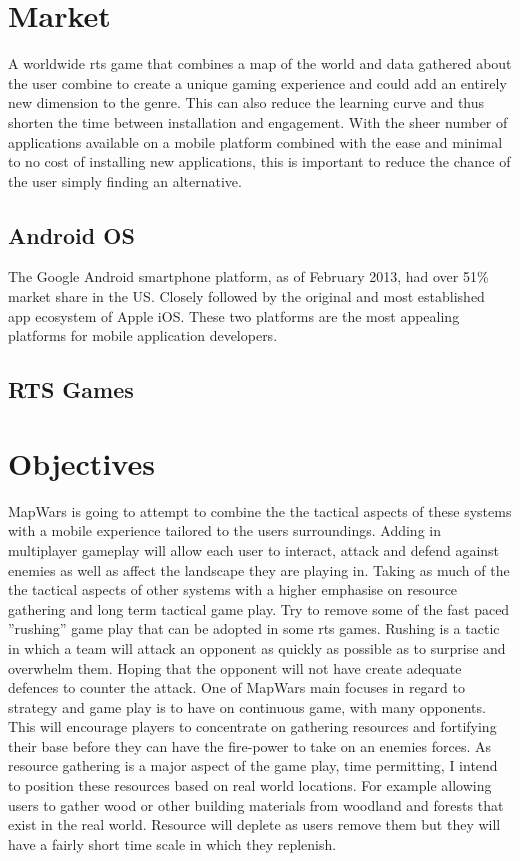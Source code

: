 \section{Market}

A worldwide \gls{rts} game that combines a map of the world and data gathered about the user combine to create a unique gaming experience and could add an entirely new dimension to the genre. This can also reduce the learning curve and thus shorten the time between installation and engagement. With the sheer number of applications available on a mobile platform combined with the ease and minimal to no cost of installing new applications, this is important to reduce the chance of the user simply finding an alternative.

\subsection{Android OS}
The Google Android smartphone platform, as of February 2013, had over 51\% market share in the US\cite{smartphone_market}. Closely followed by the original and most established app ecosystem of Apple iOS. These two platforms are the most appealing platforms for mobile application developers.

\subsection{RTS Games}


\section{Objectives}
MapWars is going to attempt to combine the the tactical aspects of these systems with a mobile experience tailored to the users surroundings. Adding in multiplayer gameplay will allow each user to interact, attack and defend against enemies as well as affect the landscape they are playing in. Taking as much of the the tactical aspects of other systems with a higher emphasise on resource gathering and long term tactical game play. Try to remove some of the fast paced ”rushing” game play that can be adopted in some \gls{rts} games. Rushing is a tactic in which a team will attack an opponent as quickly as possible as to surprise and overwhelm them. Hoping that the opponent will not have create adequate defences to counter the attack. One of MapWars main focuses in regard to strategy and game play is to have on continuous game, with many opponents. This will encourage players to concentrate on gathering resources and fortifying their base before they can have the fire-power to take on an enemies forces. As resource gathering is a major aspect of the game play, time permitting, I intend to position these resources based on real world locations. For example allowing users to gather wood or other building materials from woodland and forests that exist in the real world. Resource will deplete as users remove them but they will have a fairly short time scale in which they replenish.

